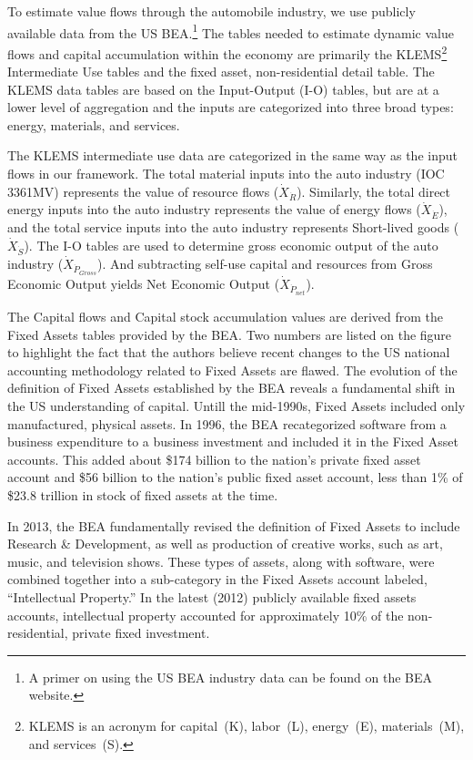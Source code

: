 To estimate value flows through the automobile industry, 
we use publicly available data from the 
US BEA.\footnote{A 
	primer on using the US BEA
	industry data can be found 
	on the BEA website.\cite{Streitwieser:2011aa}}
The  tables needed to estimate dynamic 
value flows and capital accumulation within the economy 
are primarily the KLEMS\footnote{KLEMS is an acronym for 
	capital~(K), labor~(L), energy~(E), materials~(M), and services~(S).} 
Intermediate Use
tables and 
the fixed asset, non-residential detail table. 
The KLEMS data tables
are based on the Input-Output (I-O) tables, 
but are at a lower level of aggregation and the inputs are categorized 
into three broad types: energy, materials, and services.

The KLEMS intermediate use data are categorized in the same
way as the input flows in our framework. 
The total material inputs into the auto industry (IOC 3361MV) 
represents the value of resource flows ($\dot{X}_{\dot{R}}$). 
Similarly, the total direct energy inputs into the 
auto industry represents the value of energy flows ($\dot{X}_{\dot{E}}$),
and the total service inputs into the auto industry represents 
Short-lived goods ($\dot{X}_{\dot{S}}$).
The I-O tables are used to determine gross economic output of the 
auto industry ($\dot{X}_{\dot{P}_{Gross}}$). And subtracting self-use capital and resources
from Gross Economic Output yields Net Economic Output ($\dot{X}_{\dot{P}_{net}}$).

The Capital flows and Capital stock accumulation
values are derived from the Fixed Assets tables
provided by the BEA. Two numbers are listed on the figure
to highlight the fact that the authors believe 
recent changes to the US national accounting methodology
related to Fixed Assets are flawed. 
The evolution of the definition of Fixed Assets 
established by the BEA reveals a fundamental shift 
in the US understanding of capital.
 Untill the mid-1990s, Fixed Assets included only manufactured, physical assets.
In 1996, the BEA recategorized software from a business expenditure to
a business investment and included it in the Fixed Asset accounts. This added
about \$174 billion to the nation's private fixed asset account and 
\$56 billion to the nation's public fixed asset account, less than
1\% of \$23.8 trillion in stock of fixed assets at the time.\cite[p. 20]{BEA2000}

In 2013, the BEA fundamentally revised the definition of Fixed Assets 
to include Research \& Development, as well as production of 
creative works, such as art, music, and television shows. These types of assets,
along with software, were combined together into a 
sub-category in the Fixed Assets account labeled, ``Intellectual Property.''
In the latest (2012) publicly available
fixed assets accounts, intellectual property accounted for approximately
10\% of the non-residential, private fixed investment.

